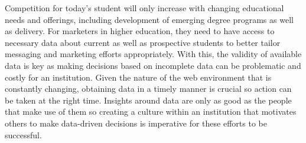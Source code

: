 \documentclass[sigconf]{acmart}
\begin{document}
Competition for today's student will only increase with changing educational needs and offerings, including development of emerging degree programs as well as delivery. For marketers in higher education, they need to have access to necessary data about current as well as prospective students to better tailor messaging and marketing efforts appropriately. With this, the validity of available data is key as making decisions based on incomplete data can be problematic and costly for an institution. Given the nature of the web environment that is constantly changing, obtaining data in a timely manner is crucial so action can be taken at the right time. Insights around data are only as good as the people that make use of them so creating a culture within an institution that motivates others to make data-driven decisions is imperative for these efforts to be successful.   






 





\end{document}
